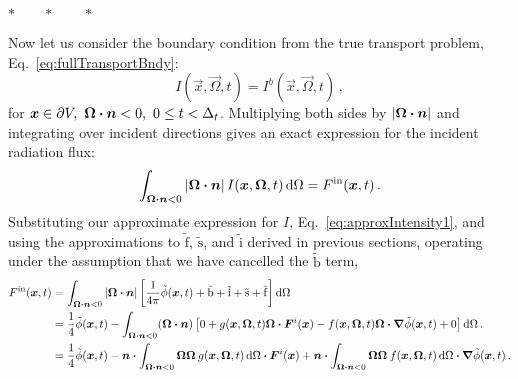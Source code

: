 \vspace{\baselineskip}
\noindent{}
$\ast\qquad \ast\qquad \ast\qquad$
\vspace{\baselineskip}

Now let us consider the boundary condition from the true transport problem,
Eq.~\eqref{eq:fullTransportBndy}:
\begin{equation*}
  I(\vec{x}, \vec{\Omega}, t)
  = I^b(\vec{x}, \vec{\Omega}, t) \,,
\end{equation*}
for $\bm{x} \in \partial V, \ \bm{\Omega} \bm{\cdot} \bm{n} < 0,
 \ 0 \le t < \Delta_t$.
 Multiplying both sides by $\left| \bm{\Omega} \bm{\cdot} \bm{n} \right|$ and
 integrating over incident directions gives an exact expression for the
 incident radiation flux:
\begin{equation*}
 \int_{\bm{\Omega} \bm{\cdot} \bm{n} < 0} \left| \bm{\Omega} \bm{\cdot} \bm{n} \right|
 I(\bm{x}, \bm{\Omega}, t) \mathop{}\!\mathrm{d}\Omega
 = F^\mathrm{in}(\bm{x}, t)\,.
\end{equation*}
Substituting our approximate expression for $I$,
Eq.~\eqref{eq:approxIntensity1}, and using the approximations to
$\mathrm{ \tilde f }$, $\mathrm{ \tilde s }$, and $\mathrm{ \tilde i }$ derived
in previous sections, operating under the assumption that we have cancelled the
$\mathrm{ \tilde b }$ term,
\begin{align}\nonumber
  F^\mathrm{in}(\bm{x}, t)
  &= \int_{\bm{\Omega} \bm{\cdot} \bm{n} < 0} \left| \bm{\Omega} \bm{\cdot} \bm{n} \right|
 \left[
   \frac1{4\pi} \tilde \phi(\bm{x}, t) 
  + \mathrm{ \tilde b }
  + \mathrm{ \tilde i }
  + \mathrm{ \tilde s }
  + \mathrm{ \tilde f }\right]\mathop{}\!\mathrm{d}\Omega
 \\\nonumber
 &=
 \frac1{4} \tilde \phi(\bm{x}, t) 
 - \int_{\bm{\Omega} \bm{\cdot} \bm{n} < 0} (\bm{\Omega} \bm{\cdot} \bm{n})\left[
 0
  + g(\bm{x}, \bm{\Omega}, t) \bm{\Omega} \bm{\cdot} \bm{F}^i(\bm{x})
  - f(\bm{x}, \bm{\Omega}, t) \bm{\Omega} \bm{\cdot} \bm{\nabla} \tilde\phi(\bm{x}, t)
  + 0 \right]\mathop{}\!\mathrm{d}\Omega\,.
\\ \label{eq:bndyAnisotropic}
 &=
 \frac1{4} \tilde \phi(\bm{x}, t) 
 - \bm{n} \bm{\cdot} \int_{\bm{\Omega} \bm{\cdot} \bm{n} < 0} \bm{\Omega} \bm{\Omega}\:
 g(\bm{x}, \bm{\Omega}, t) \mathop{}\!\mathrm{d}\Omega \bm{\cdot} \bm{F}^i(\bm{x})
 + \bm{n} \bm{\cdot} \int_{\bm{\Omega} \bm{\cdot} \bm{n} < 0} \bm{\Omega} \bm{\Omega}\:
 f(\bm{x}, \bm{\Omega}, t) \mathop{}\!\mathrm{d}\Omega \bm{\cdot} \bm{\nabla} \tilde\phi(\bm{x}, t)
\,.
\end{align}

